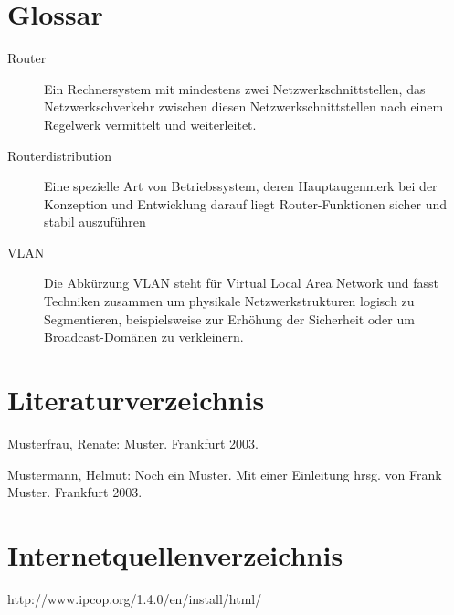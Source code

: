 \documentclass[a4paper,12pt]{scrartcl}
\begin{document}
\section{Glossar}
\begin{description}
 \item[Router] Ein Rechnersystem mit mindestens zwei Netzwerkschnittstellen,
das Netzwerkschverkehr zwischen diesen Netzwerkschnittstellen nach einem
Regelwerk vermittelt und weiterleitet.
 \item[Routerdistribution] Eine spezielle Art von Betriebssystem, deren
Hauptaugenmerk bei der Konzeption und Entwicklung darauf liegt
Router-Funktionen sicher und stabil auszuf\"uhren
 \item[VLAN] Die Abk\"urzung VLAN steht f\"ur Virtual Local Area Network und
fasst Techniken zusammen um physikale Netzwerkstrukturen logisch zu
Segmentieren, beispielsweise zur Erh\"ohung der Sicherheit oder um
Broadcast-Dom\"anen zu verkleinern.
\end{description}
\clearpage

\section{Literaturverzeichnis}

Musterfrau, Renate: Muster. Frankfurt 2003.


Mustermann, Helmut: Noch ein Muster. Mit einer Einleitung hrsg. von Frank Muster. Frankfurt 2003.
\section{Internetquellenverzeichnis}
\begin{thebibliography}{99}
 http://www.ipcop.org/1.4.0/en/install/html/
\end{thebibliography}
\end{document}
